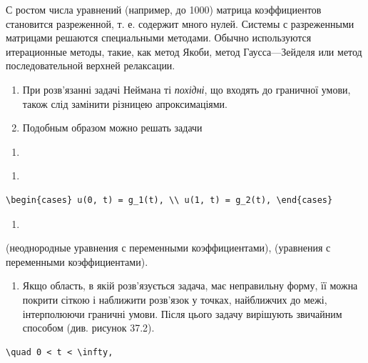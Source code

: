 \documentclass[
  ukrainian,
]{article}
\providecommand{\tightlist}{%
  \setlength{\itemsep}{0pt}\setlength{\parskip}{0pt}}
\begin{document}
С ростом числа уравнений (например, до 1000) матрица коэффициентов
становится разреженной, т. е. содержит много нулей. Системы с
разреженными матрицами решаются специальными методами. Обычно
используются итерационные методы, такие, как метод Якоби, метод
Гаусса---Зейделя или метод последовательной верхней релаксации.

\begin{enumerate}
\def\labelenumi{\arabic{enumi}.}
\setcounter{enumi}{3}
\item
  При розв'язанні задачі Неймана ті \emph{похідні}, що входять до
  граничної умови, також слід замінити різницею апроксимаціями.
\item
  Подобным образом можно решать задачи
\end{enumerate}

\begin{enumerate}
\def\labelenumi{\alph{enumi})}
\tightlist
\item
\end{enumerate}

\begin{enumerate}
\def\labelenumi{\arabic{enumi})}
\setcounter{enumi}{5}
\tightlist
\item
\end{enumerate}

\begin{verbatim}
\begin{cases} u(0, t) = g_1(t), \\ u(1, t) = g_2(t), \end{cases}
\end{verbatim}

\begin{enumerate}
\def\labelenumi{\Alph{enumi})}
\setcounter{enumi}{1}
\tightlist
\item
\end{enumerate}

(неоднородные уравнения с переменными коэффициентами), (уравнения с
переменными коэффициентами).

\begin{enumerate}
\def\labelenumi{\arabic{enumi}.}
\setcounter{enumi}{5}
\tightlist
\item
  Якщо область, в якій розв'язується задача, має неправильну форму, її
  можна покрити сіткою і наближити розв'язок у точках, найближчих до
  межі, інтерполюючи граничні умови. Після цього задачу вирішують
  звичайним способом (див. рисунок 37.2).
\end{enumerate}

\begin{verbatim}
\quad 0 < t < \infty,
\end{verbatim}
\end{document}

